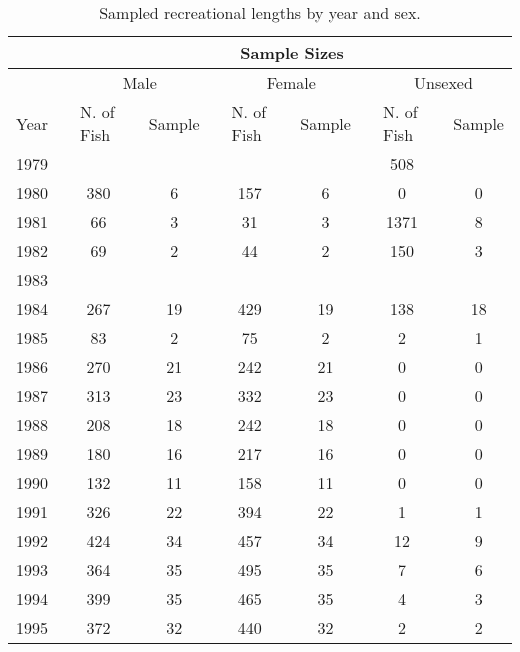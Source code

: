 \begingroup\fontsize{10}{12}\selectfont
\begingroup\fontsize{10}{12}\selectfont

\begin{table}[]
\caption{Sampled recreational lengths by year and sex.}
\label{tab:rec_length_sample}
\begin{tabular}{rlclclclclclc}
\hline
\multicolumn{1}{l}{} &  & \multicolumn{11}{c}{Sample Sizes} \\ \hline
\multicolumn{1}{l}{} &  & \multicolumn{3}{c}{Male} &  & \multicolumn{3}{c}{Female} &  & \multicolumn{3}{c}{Unsexed} \\ \cline{3-5} \cline{7-9} \cline{11-13} 
\multicolumn{1}{l}{Year} &  & \multicolumn{1}{l}{N. of  Fish} &  & \multicolumn{1}{l}{Sample} &  & \multicolumn{1}{l}{N. of Fish} &  & \multicolumn{1}{l}{Sample} &  & \multicolumn{1}{l}{N. of Fish} &  & \multicolumn{1}{l}{Sample} \\ \hline
1979 &  &  &  &  &  &  &  &  &  & 508 &  &  \\
1980 &  & 380 &  & 6 &  & 157 &  & 6 &  & 0 &  & 0 \\
1981 &  & 66 &  & 3 &  & 31 &  & 3 &  & 1371 &  & 8 \\
1982 &  & 69 &  & 2 &  & 44 &  & 2 &  & 150 &  & 3 \\
1983 &  &  &  &  &  &  &  &  &  &  &  &  \\
1984 &  & 267 &  & 19 &  & 429 &  & 19 &  & 138 &  & 18 \\
1985 &  & 83 &  & 2 &  & 75 &  & 2 &  & 2 &  & 1 \\
1986 &  & 270 &  & 21 &  & 242 &  & 21 & \multicolumn{1}{c}{} & 0 &  & 0 \\
1987 &  & 313 &  & 23 &  & 332 &  & 23 &  & 0 &  & 0 \\
1988 &  & 208 &  & 18 &  & 242 &  & 18 &  & 0 &  & 0 \\
1989 &  & 180 &  & 16 &  & 217 &  & 16 &  & 0 &  & 0 \\
1990 &  & 132 &  & 11 &  & 158 &  & 11 & \multicolumn{1}{c}{} & 0 &  & 0 \\
1991 &  & 326 &  & 22 &  & 394 &  & 22 & \multicolumn{1}{c}{} & 1 &  & 1 \\
1992 &  & 424 &  & 34 &  & 457 &  & 34 & \multicolumn{1}{c}{} & 12 &  & 9 \\
1993 &  & 364 &  & 35 &  & 495 &  & 35 &  & 7 &  & 6 \\
1994 &  & 399 &  & 35 &  & 465 &  & 35 &  & 4 &  & 3 \\
1995 &  & 372 &  & 32 &  & 440 &  & 32 &  & 2 &  & 2 \\

\end{tabular}
\end{table}
